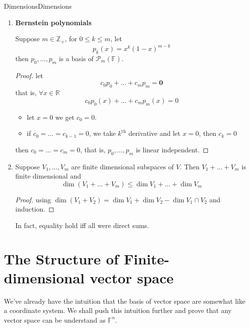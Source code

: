 \documentclass[../main.tex]{subfiles}
\begin{document}
\begin{example}{Dimensions}{Dimensions}
\begin{enumerate}
	\item \textbf{Bernstein polynomials }

		Suppose $m\in \mathbb{Z}_{+}$, for $0\leq k\leq m$, let 
		\begin{equation}
		p_k(x) = x^k(1-x)^{m-k}
		\end{equation}
		then $p_0, \ldots ,p_m$ is a basis of $\mathscr{P}_m(\mathbb{F})$.
		\begin{proof}
		let
		\begin{equation*}
		c_0p_0+\ldots +c_mp_m = \boldsymbol{0}
		\end{equation*}
		that is, $\forall x \in \mathbb{R}$
		\begin{equation*}
		c_0p_0(x)+\ldots +c_mp_m(x)=0
		\end{equation*}
		\begin{itemize}
		\item let $x=0$ we get $c_0=0$.
		\item if $c_0=\ldots =c_{k-1}=0$, we take $k^\text{th}$ derivative and let $x = 0$, then  $c_k=0$
		\end{itemize}
		then $c_0=\ldots =c_m=0$, that is,  $p_0, \ldots ,p_m$ is linear independent.
		\end{proof}

	\item Suppose $V_1, \ldots ,V_m$ are finite dimensional subspaces of $V$. Then $V_1+\ldots +V_m$ is finite dimensional and
		\begin{equation}
		\dim(V_1+\ldots +V_m) \leq \dim V_1+\ldots +\dim V_m
		\end{equation}
		\begin{proof}
		using $\dim (V_1+V_2) = \dim V_1+\dim V_2-\dim V_1\cap V_2$ and induction.
		\end{proof}

		In fact, equality hold iff all were direct sums.
\end{enumerate}
\end{example}


\section{The Structure of Finite-dimensional vector space}

We've already have the intuition that the basis of vector space are somewhat like a coordinate system. We shall push this intuition further and prove that any vector space can be understand as $\mathbb{F}^n$.
\end{document}
